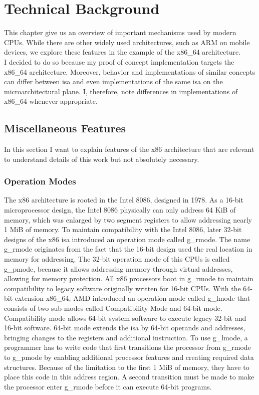 \section{Technical Background}
\label{sec:state:technical}
This chapter give us an overview of important mechanisms used by modern CPUs.
While there are other widely used architectures, such as ARM on mobile devices,
we explore these features in the example of the x86\_64 architecture. \\

I decided to do so because my proof of concept implementation targets the
x86\_64 architecture. Moreover, behavior and implementations of similar concepts
can differ between \gls{isa} and even implementations of the
same \gls{isa} on the microarchitectural plane. I, therefore, note
differences in implementations of x86\_64 whenever appropriate.

\subsection{Miscellaneous Features}
\label{sec:state:technical:misc}
In this section I want to explain features of the x86 architecture that are
relevant to understand details of this work but not absolutely necessary.

\subsubsection{Operation Modes}
\label{sec:state:technical:modes}
The x86 architecture is rooted in the Intel 8086, designed in 1978. As a 16-bit
microprocessor design, the Intel 8086 physically can only address 64 KiB of
memory, which was enlarged by two segment registers to allow addressing nearly 1
MiB of memory. To maintain compatibility with the Intel 8086, later 32-bit
designs of the x86 \gls{isa} introduced an operation mode called \gls{g_rmode}.
The name \gls{g_rmode} originates from the fact that the 16-bit design used the
real location in memory for addressing. The 32-bit operation mode of this CPUs
is called \gls{g_pmode}, because it allows addressing memory through virtual
addresses, allowing for memory protection. All x86 processors boot in
\gls{g_rmode} to maintain compatibility to legacy software originally written
for 16-bit CPUs. With the 64-bit extension x86\_64, AMD introduced an operation
mode called \gls{g_lmode} that consists of two sub-modes called Compatibility
Mode and 64-bit mode. Compatibility mode allows 64-bit system software to
execute legacy 32-bit and 16-bit software. 64-bit mode extends the \gls{isa} by
64-bit operands and addresses, bringing changes to the registers and additional
instruction. To use \gls{g_lmode}, a programmer has to write code that first
transitions the processor from \gls{g_rmode} to \gls{g_pmode} by enabling
additional processor features and creating required data structures. Because of
the limitation to the first 1 MiB of memory, they have to place this code in
this address region. A second transition must be made to make the processor
enter \gls{g_rmode} before it can execute 64-bit programs.

